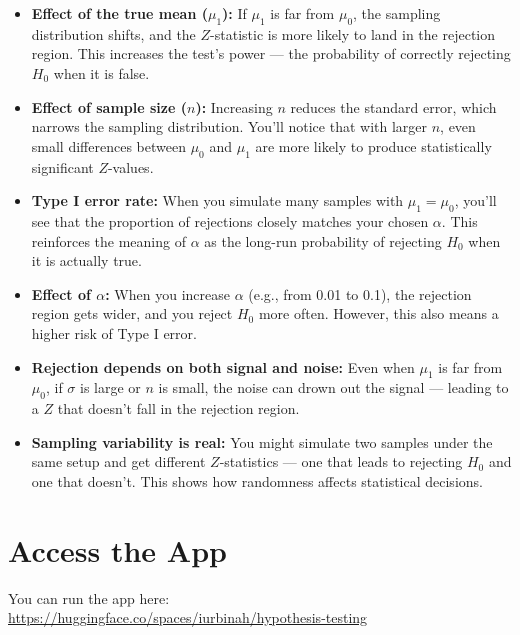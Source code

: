 \documentclass[11pt]{article}
\begin{document}
\begin{itemize}
  \item \textbf{Effect of the true mean ($\mu_1$):} If $\mu_1$ is far from $\mu_0$, the sampling distribution shifts, and the $Z$-statistic is more likely to land in the rejection region. This increases the test's power — the probability of correctly rejecting $H_0$ when it is false.
  
  \item \textbf{Effect of sample size ($n$):} Increasing $n$ reduces the standard error, which narrows the sampling distribution. You’ll notice that with larger $n$, even small differences between $\mu_0$ and $\mu_1$ are more likely to produce statistically significant $Z$-values.

  \item \textbf{Type I error rate:} When you simulate many samples with $\mu_1 = \mu_0$, you’ll see that the proportion of rejections closely matches your chosen $\alpha$. This reinforces the meaning of $\alpha$ as the long-run probability of rejecting $H_0$ when it is actually true.

  \item \textbf{Effect of $\alpha$:} When you increase $\alpha$ (e.g., from 0.01 to 0.1), the rejection region gets wider, and you reject $H_0$ more often. However, this also means a higher risk of Type I error.

  \item \textbf{Rejection depends on both signal and noise:} Even when $\mu_1$ is far from $\mu_0$, if $\sigma$ is large or $n$ is small, the noise can drown out the signal — leading to a $Z$ that doesn’t fall in the rejection region.

  \item \textbf{Sampling variability is real:} You might simulate two samples under the same setup and get different $Z$-statistics — one that leads to rejecting $H_0$ and one that doesn't. This shows how randomness affects statistical decisions.
\end{itemize}

\section*{Access the App}

You can run the app here: \\
\url{https://huggingface.co/spaces/iurbinah/hypothesis-testing}
\end{document}
